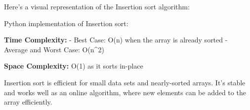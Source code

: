 Here's a visual representation of the Insertion sort algorithm:

\begin{Shaded}
\begin{Highlighting}[]
\end{Highlighting}
\end{Shaded}

Python implementation of Insertion sort:

\begin{Shaded}
\begin{Highlighting}[]
     \NormalTok{(}\NormalTok{, }
\OperatorTok{=}
\OperatorTok{=}\OperatorTok{{-}} 
        \OperatorTok{\textgreater{}=}  \OperatorTok{\textgreater{}}
\NormalTok{            arr[j }\OperatorTok{+} \NormalTok{] }\OperatorTok{=}
\OperatorTok{{-}=} 
\NormalTok{        arr[j }\OperatorTok{+} \NormalTok{] }\OperatorTok{=}
\end{Highlighting}
\end{Shaded}

\textbf{Time Complexity:} - Best Case: O(n) when the array is already
sorted - Average and Worst Case: O(n\^{}2)

\textbf{Space Complexity:} O(1) as it sorts in-place

Insertion sort is efficient for small data sets and nearly-sorted
arrays. It's stable and works well as an online algorithm, where new
elements can be added to the array efficiently.


